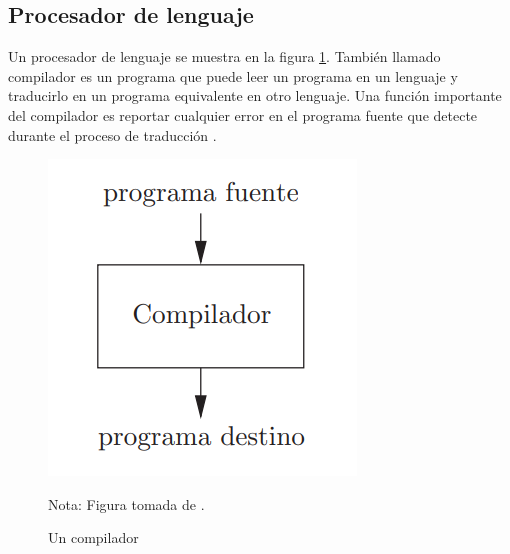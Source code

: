 \subsection{Procesador de lenguaje}
Un procesador de lenguaje se muestra en la figura \ref{compilador1}. También llamado compilador es un programa que puede leer un programa en un lenguaje y traducirlo en un programa equivalente en otro lenguaje. Una función importante del compilador es reportar cualquier error en el programa fuente que detecte durante el proceso de traducción \cite{aho2008compiladores}.
\begin{figure}[h!]
\centering
\includegraphics[scale=0.6]{imagenes/compilador1}
\caption{Un compilador}
Nota: Figura tomada de \cite{aho2008compiladores}.
\label{compilador1}
\end{figure}

